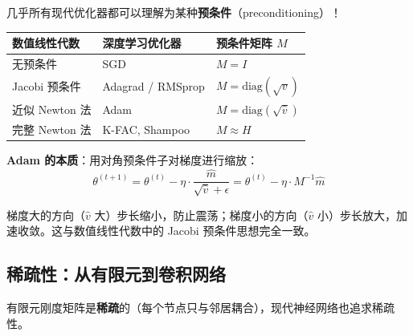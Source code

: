 几乎所有现代优化器都可以理解为某种\textbf{预条件}（preconditioning）！

\begin{center}
\renewcommand{\arraystretch}{1.4}
\begin{tabular}{l|l|l}
\toprule
\textbf{数值线性代数} & \textbf{深度学习优化器} & \textbf{预条件矩阵 $M$} \\
\midrule
无预条件 & SGD & $M = I$ \\
Jacobi 预条件 & Adagrad / RMSprop & $M = \text{diag}(\sqrt{v})$ \\
近似 Newton 法 & Adam & $M = \text{diag}(\sqrt{\hat{v}})$ \\
完整 Newton 法 & K-FAC, Shampoo & $M \approx H$ \\
\bottomrule
\end{tabular}
\end{center}

\textbf{Adam 的本质}：用对角预条件子对梯度进行缩放：
\begin{equation}
\theta^{(t+1)} = \theta^{(t)} - \eta \cdot \frac{\hat{m}}{\sqrt{\hat{v}} + \epsilon} = \theta^{(t)} - \eta \cdot M^{-1} \hat{m}
\end{equation}

梯度大的方向（$\hat{v}$ 大）步长缩小，防止震荡；梯度小的方向（$\hat{v}$ 小）步长放大，加速收敛。这与数值线性代数中的 Jacobi 预条件思想完全一致。

\subsection*{稀疏性：从有限元到卷积网络}

有限元刚度矩阵是\textbf{稀疏}的（每个节点只与邻居耦合），现代神经网络也追求稀疏性。

